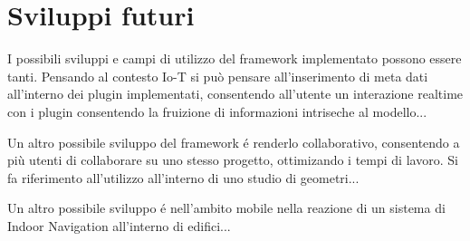 \section{Sviluppi futuri}
\label{sec:conclusions_section_2}

I possibili sviluppi e campi di utilizzo del framework implementato possono essere tanti.
Pensando al contesto Io-T si può pensare all'inserimento di meta dati all'interno dei plugin implementati,
consentendo all'utente un interazione realtime con i plugin consentendo la fruizione di informazioni
intriseche al modello...


Un altro possibile sviluppo del framework \'e renderlo collaborativo, consentendo a più utenti
di collaborare su uno stesso progetto, ottimizando i tempi di lavoro. Si fa riferimento
all'utilizzo all'interno di uno studio di geometri...


Un altro possibile sviluppo \'e nell'ambito mobile nella reazione di un sistema di
Indoor Navigation all'interno di edifici...
